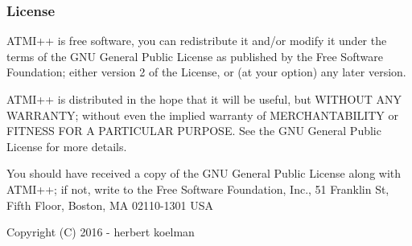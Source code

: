 \subsubsection*{License}





A\+T\+M\+I++ is free software, you can redistribute it and/or modify it under the terms of the G\+N\+U General Public License as published by the Free Software Foundation; either version 2 of the License, or (at your option) any later version.

A\+T\+M\+I++ is distributed in the hope that it will be useful, but W\+I\+T\+H\+O\+U\+T A\+N\+Y W\+A\+R\+R\+A\+N\+T\+Y; without even the implied warranty of M\+E\+R\+C\+H\+A\+N\+T\+A\+B\+I\+L\+I\+T\+Y or F\+I\+T\+N\+E\+S\+S F\+O\+R A P\+A\+R\+T\+I\+C\+U\+L\+A\+R P\+U\+R\+P\+O\+S\+E. See the G\+N\+U General Public License for more details.

You should have received a copy of the G\+N\+U General Public License along with A\+T\+M\+I++; if not, write to the Free Software Foundation, Inc., 51 Franklin St, Fifth Floor, Boston, M\+A 02110-\/1301 U\+S\+A 

 Copyright (C) 2016 -\/ herbert koelman 